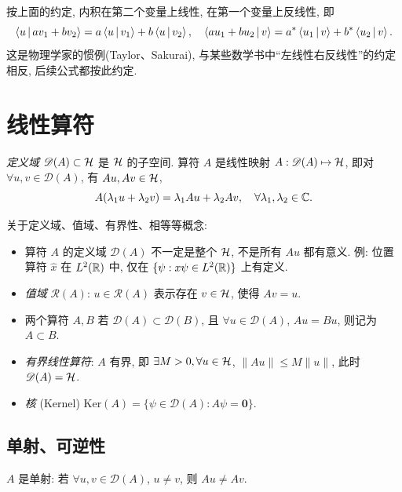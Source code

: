 \begin{remark}
按上面的约定, 内积在第二个变量上线性, 在第一个变量上反线性, 即
\[\left\langle u \,\middle|\, a v_1+b v_2 \right\rangle=a\left\langle u \,\middle|\, v_1 \right\rangle+b\left\langle u \,\middle|\, v_2 \right\rangle,\quad \left\langle a u_1+b u_2 \,\middle|\, v \right\rangle=a^{*}\left\langle u_1 \,\middle|\, v \right\rangle+b^{*}\left\langle u_2 \,\middle|\, v \right\rangle.\]
这是物理学家的惯例(Taylor、Sakurai), 与某些数学书中``左线性右反线性''的约定相反, 后续公式都按此约定.
\end{remark}

\section{线性算符}\label{sec:linear-operators}

\begin{definition}[线性算符]
\emph{定义域} $\mathscr D(A)\subset \mathcal{H}$ 是 $\mathcal{H}$ 的子空间. 算符 $A$ 是线性映射 $A:\mathscr D(A)\mapsto \mathcal{H}$, 即对 $\forall u,v\in\mathscr D(A)$, 有 $Au,Av\in\mathcal{H}$,
\begin{equation}
A(\lambda_1 u+\lambda_2 v)=\lambda_1 Au+\lambda_2 Av,\quad \forall \lambda_1,\lambda_2\in\mathbb{C}.
\end{equation}
\end{definition}

关于定义域、值域、有界性、相等等概念:
\begin{itemize}
    \item 算符 $A$ 的定义域 $\mathscr D(A)$ 不一定是整个 $\mathcal{H}$, 不是所有 $Au$ 都有意义. 例: 位置算符 $\hat x$ 在 $L^{2}(\mathbb{R})$ 中, 仅在 $\{\psi:x\psi\in L^{2}(\mathbb{R})\}$ 上有定义.
    \item \emph{值域} $\mathscr R(A)$: $u\in\mathscr R(A)$ 表示存在 $v\in\mathcal{H}$, 使得 $Av=u$.
    \item 两个算符 $A,B$ 若 $\mathscr D(A)\subset\mathscr D(B)$, 且 $\forall u\in\mathscr D(A)$, $Au=Bu$, 则记为 $A\subset B$.
    \item \emph{有界线性算符}: $A$ 有界, 即 $\exists M>0, \forall u\in\mathcal{H}$, $\|Au\|\leq M\|u\|$, 此时 $\mathscr D(A)=\mathcal{H}$.
    \item \emph{核} (Kernel) $\mathrm{Ker}(A)=\{\psi\in\mathscr D(A): A\psi=\mathbf 0\}$.
\end{itemize}

\subsection{单射、可逆性}

\begin{definition}[单射 (injective)]
$A$ 是单射: 若 $\forall u,v\in\mathscr D(A)$, $u\neq v$, 则 $Au\neq Av$.
\end{definition}


